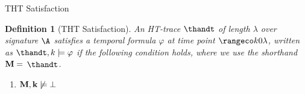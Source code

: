 \documentclass[aspectratio=169,xcolor=svgnames]{beamer}
\theoremstyle{theoremstyle_space}
\newtheorem{definition}{Definition}
\begin{document}
\begin{frame}[t]{THT Satisfaction}

\begin{definition}[THT Satisfaction]
An HT-trace $\thandt$ of length $\lambda$ over signature $\A$
  satisfies a temporal formula $\varphi$ at time point
  $\kinlambda$, written as $\thandt,k \models \varphi$ if
  the following condition holds, where we use the shorthand
  $\bf{M} =$ $\thandt$.
\begin{enumerate}
  \item $\bf{M}, k \not \models \bot$

\end{enumerate}
\end{definition}
\end{frame}
\end{document}
